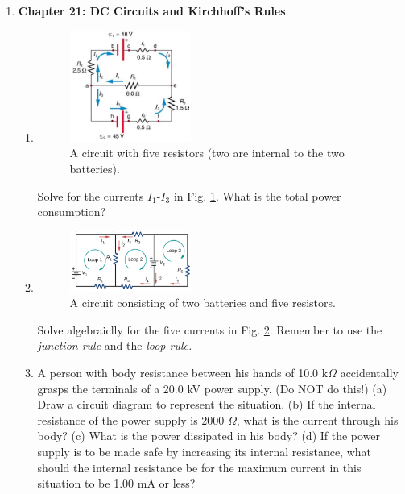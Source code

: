 \documentclass[10pt]{article}
\begin{document}
\begin{enumerate}
\item \textbf{Chapter 21: DC Circuits and Kirchhoff's Rules}
\begin{enumerate}
\item 
\begin{figure}[ht]
\centering
\includegraphics[width=0.4\textwidth]{circuit1.png}
\caption{\label{fig:circuit1} A circuit with five resistors (two are internal to the two batteries).}
\end{figure}
Solve for the currents $I_1$-$I_3$ in Fig. \ref{fig:circuit1}.  What is the total power consumption? \\ \vspace{4cm}
\item 
\begin{figure}[ht]
\centering
\includegraphics[width=0.4\textwidth]{circuit2.png}
\caption{\label{fig:circuit2} A circuit consisting of two batteries and five resistors.}
\end{figure}
Solve algebraiclly for the five currents in Fig. \ref{fig:circuit2}.  Remember to use the \textit{junction rule} and the \textit{loop rule.} \\ \vspace{4cm}
\item A person with body resistance between his hands of 10.0 k$\Omega$ accidentally grasps the terminals of a 20.0 kV power supply. (Do NOT do this!) (a) Draw a circuit diagram to represent the situation. (b) If the internal resistance of the power supply is 2000 $\Omega$, what is the current through his body? (c) What is the power dissipated in his body? (d) If the power supply is to be made safe by increasing its internal resistance, what should the internal resistance be for the maximum current in this situation to be 1.00 mA or less? \\ \vspace{3cm}

\end{enumerate}
\end{enumerate}
\end{document}
